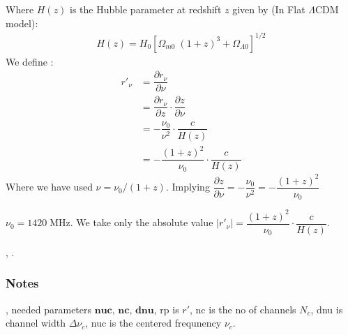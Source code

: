 \documentclass[a4paper,11pt,oneside,english,openany]{sphinxmanual}
\begin{document}
\sphinxAtStartPar
Where \(H(z)\) is the Hubble parameter at red\sphinxhyphen{}shift \(z\) given by (In Flat \(\Lambda\text{CDM}\) model):
\begin{equation*}
\begin{split}H(z)=H_0\left[\Omega_{m0}\;(1+z)^3+\Omega_{\Lambda0}\right]^{1/2}\end{split}
\end{equation*}
\sphinxAtStartPar
We define :
\begin{equation*}
\begin{split}r'_{\nu}&=\dfrac{\partial r_{\nu}}{\partial \nu}\\
        &= \dfrac{\partial r_{\nu}}{\partial z}\cdot\dfrac{\partial z}{\partial \nu}\\
        & = -\dfrac{\nu_0}{\nu^2}\cdot \dfrac{c}{H(z)}\\
        & = -\dfrac{(1+z)^2}{\nu_0} \cdot \dfrac{c}{H(z)}\end{split}
\end{equation*}
\sphinxAtStartPar
Where we have used \(\nu=\nu_0/(1+z)\). Implying \(\dfrac{\partial z}{\partial \nu} = -\dfrac{\nu_0}{\nu^2}=-\dfrac{(1+z)^2}{\nu_0}\)

\sphinxAtStartPar
\(\nu_0 = 1420\; \mathrm{MHz}\). We take only the absolute value \(|r'_{\nu}|=\dfrac{(1+z)^2}{\nu_0} \cdot \dfrac{c}{H(z)}\).

\sphinxAtStartPar
{}  , .
\subsubsection*{Notes}

\sphinxAtStartPar
{}, needed parameters \(\textbf{nuc, nc, dnu}\), rp is \(r'\), nc is the no of channels \(N_c\), dnu is channel width \(\Delta\nu_c\), nuc is the centered frequnency \(\nu_c\).
\end{document}
